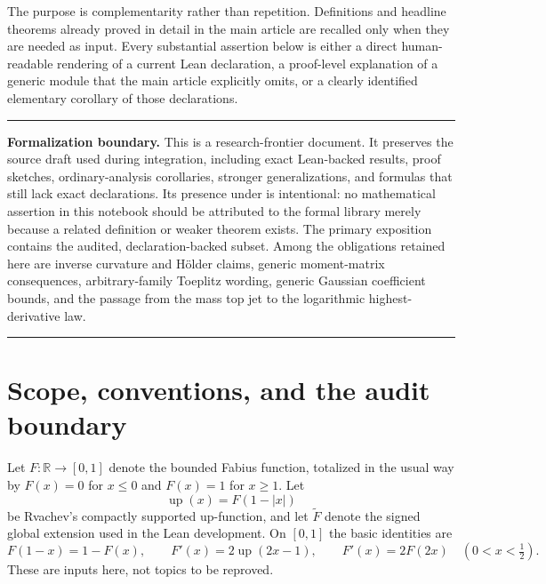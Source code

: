 \documentclass[11pt,oneside]{article}
\theoremstyle{definition}
\theoremstyle{remark}
\newcommand{\R}{\mathbb R}
\newcommand{\Up}{\operatorname{up}}
\newenvironment{boxedremark}{%
  \par\smallskip\noindent\begin{center}\begin{minipage}{0.94\textwidth}%
  \color{black}\hrule\vspace{0.6em}\small
}{%
  \vspace{0.6em}\hrule\end{minipage}\end{center}\smallskip
}
\begin{document}
The purpose is complementarity rather than repetition.  Definitions and headline theorems
already proved in detail in the main article are recalled only when they are needed as input.
Every substantial assertion below is either a direct human-readable rendering of a current
Lean declaration, a proof-level explanation of a generic module that the main article
explicitly omits, or a clearly identified elementary corollary of those declarations.


\begin{boxedremark}
\textbf{Formalization boundary.}
This is a research-frontier document.  It preserves the source draft used during integration,
including exact Lean-backed results, proof sketches, ordinary-analysis corollaries, stronger
generalizations, and formulas that still lack exact declarations.  Its presence under
 is intentional: no mathematical assertion in this
notebook should be attributed to the formal library merely because a related definition or
weaker theorem exists.  The primary exposition contains the audited, declaration-backed
subset.  Among the obligations retained here are inverse curvature and H\"older claims,
generic moment-matrix consequences, arbitrary-family Toeplitz wording, generic Gaussian
coefficient bounds, and the passage from the mass top jet to the logarithmic
highest-derivative law.
\end{boxedremark}

\section{Scope, conventions, and the audit boundary}
\label{integration:sec:scope}

Let $F:\R\to[0,1]$ denote the bounded Fabius function, totalized in the usual way by
$F(x)=0$ for $x\le0$ and $F(x)=1$ for $x\ge1$.  Let
\begin{equation}
 \Up(x)=F(1-|x|)
 \label{integration:eq:up-fold-supp}
\end{equation}
be Rvachev's compactly supported up-function, and let $\widetilde F$ denote the signed
global extension used in the Lean development.  On $[0,1]$ the basic identities are
\begin{equation}
 F(1-x)=1-F(x),
 \qquad
 F'(x)=2\Up(2x-1),
 \qquad
 F'(x)=2F(2x)\quad(0<x<\tfrac12).
 \label{integration:eq:basic-inputs}
\end{equation}
These are inputs here, not topics to be reproved.
\end{document}
